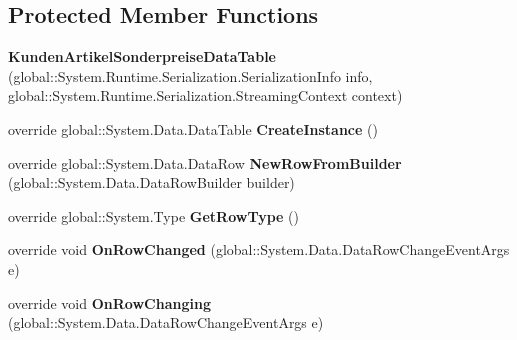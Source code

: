 \subsection*{Protected Member Functions}
\begin{DoxyCompactItemize}
\item 
{\bfseries Kunden\+Artikel\+Sonderpreise\+Data\+Table} (global\+::\+System.\+Runtime.\+Serialization.\+Serialization\+Info info, global\+::\+System.\+Runtime.\+Serialization.\+Streaming\+Context context)\hypertarget{class_products_1_1_data_1_1ds_sage_1_1_kunden_artikel_sonderpreise_data_table_a6012e0b03c42eaff1eeafa138831e20e}{}\label{class_products_1_1_data_1_1ds_sage_1_1_kunden_artikel_sonderpreise_data_table_a6012e0b03c42eaff1eeafa138831e20e}

\item 
override global\+::\+System.\+Data.\+Data\+Table {\bfseries Create\+Instance} ()\hypertarget{class_products_1_1_data_1_1ds_sage_1_1_kunden_artikel_sonderpreise_data_table_a690c4e291cccef6683ccd491aeb4d216}{}\label{class_products_1_1_data_1_1ds_sage_1_1_kunden_artikel_sonderpreise_data_table_a690c4e291cccef6683ccd491aeb4d216}

\item 
override global\+::\+System.\+Data.\+Data\+Row {\bfseries New\+Row\+From\+Builder} (global\+::\+System.\+Data.\+Data\+Row\+Builder builder)\hypertarget{class_products_1_1_data_1_1ds_sage_1_1_kunden_artikel_sonderpreise_data_table_a854d41cb7ac7113651c0f6fe154a124c}{}\label{class_products_1_1_data_1_1ds_sage_1_1_kunden_artikel_sonderpreise_data_table_a854d41cb7ac7113651c0f6fe154a124c}

\item 
override global\+::\+System.\+Type {\bfseries Get\+Row\+Type} ()\hypertarget{class_products_1_1_data_1_1ds_sage_1_1_kunden_artikel_sonderpreise_data_table_a4b57edb6b63291923f86142a98c23037}{}\label{class_products_1_1_data_1_1ds_sage_1_1_kunden_artikel_sonderpreise_data_table_a4b57edb6b63291923f86142a98c23037}

\item 
override void {\bfseries On\+Row\+Changed} (global\+::\+System.\+Data.\+Data\+Row\+Change\+Event\+Args e)\hypertarget{class_products_1_1_data_1_1ds_sage_1_1_kunden_artikel_sonderpreise_data_table_a16149ec391639a3593498e2ac64351f9}{}\label{class_products_1_1_data_1_1ds_sage_1_1_kunden_artikel_sonderpreise_data_table_a16149ec391639a3593498e2ac64351f9}

\item 
override void {\bfseries On\+Row\+Changing} (global\+::\+System.\+Data.\+Data\+Row\+Change\+Event\+Args e)\hypertarget{class_products_1_1_data_1_1ds_sage_1_1_kunden_artikel_sonderpreise_data_table_ab1b3073ce2e0c554f724840fddeb6305}{}\label{class_products_1_1_data_1_1ds_sage_1_1_kunden_artikel_sonderpreise_data_table_ab1b3073ce2e0c554f724840fddeb6305}


\end{DoxyCompactItemize}
